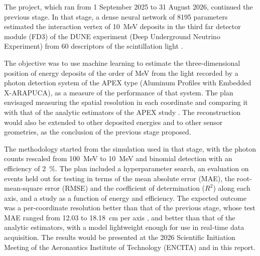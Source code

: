 \label{sec:resumo_plano}

The project, which ran from 1 September 2025 to 31 August 2026, continued the previous stage. In that stage, a dense neural network of \num{8195} parameters estimated the interaction vertex of \qty{10}{\MeV} deposits in the third far detector module (FD3) of the DUNE experiment (Deep Underground Neutrino Experiment) from \num{60} descriptors of the scintillation light \citep{vicentin2024study}.

The objective was to use machine learning to estimate the three-dimensional position of energy deposits of the order of MeV from the light recorded by a photon detection system of the APEX type (Aluminum Profiles with Embedded X-ARAPUCA), as a measure of the performance of that system. The plan envisaged measuring the spatial resolution in each coordinate and comparing it with that of the analytic estimators of the APEX study \citep{marinho2025apex}. The reconstruction would also be extended to other deposited energies and to other sensor geometries, as the conclusion of the previous stage proposed.

The methodology started from the simulation used in that stage, with the photon counts rescaled from \qty{100}{\MeV} to \qty{10}{\MeV} and binomial detection with an efficiency of \qty{2}{\percent}. The plan included a hyperparameter search, an evaluation on events held out for testing in terms of the mean absolute error (MAE), the root-mean-square error (RMSE) and the coefficient of determination ($R^2$) along each axis, and a study as a function of energy and efficiency. The expected outcome was a per-coordinate resolution better than that of the previous stage, whose test MAE ranged from \num{12.03} to \qty{18.18}{\cm} per axis \citep{vicentin2024study}, and better than that of the analytic estimators, with a model lightweight enough for use in real-time data acquisition. The results would be presented at the 2026 Scientific Initiation Meeting of the Aeronautics Institute of Technology (ENCITA) and in this report.
